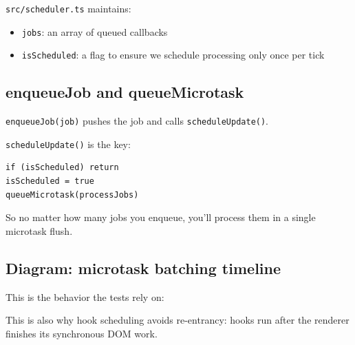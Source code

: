 \texttt{src/scheduler.ts} maintains:

\begin{itemize}
  \item \texttt{jobs}: an array of queued callbacks
  \item \texttt{isScheduled}: a flag to ensure we schedule processing only once per tick
\end{itemize}

\subsection{enqueueJob and queueMicrotask}

\texttt{enqueueJob(job)} pushes the job and calls \texttt{scheduleUpdate()}.

\texttt{scheduleUpdate()} is the key:

\begin{verbatim}
if (isScheduled) return
isScheduled = true
queueMicrotask(processJobs)
\end{verbatim}

So no matter how many jobs you enqueue, you’ll process them in a single microtask flush.

\subsection*{Diagram: microtask batching timeline}
This is the behavior the tests rely on:

\begin{center}
\end{center}

This is also why hook scheduling avoids re-entrancy: hooks run after the renderer finishes its synchronous DOM work.

